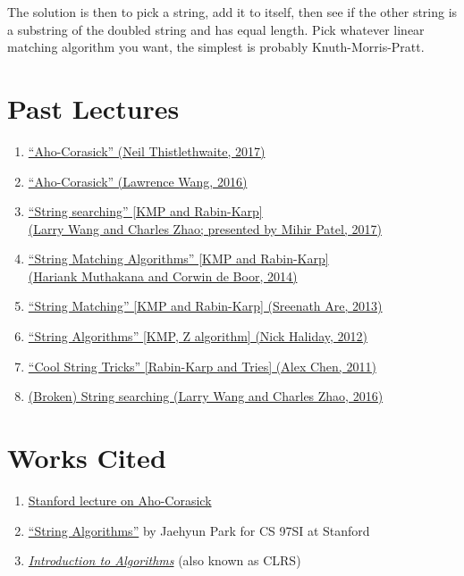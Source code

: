 \documentclass[11pt, oneside]{article}
\begin{document}
\begin{enumerate}
  The solution is then to pick a string, add it to itself, then see if the other string is a substring of the doubled string
  and has equal length. Pick whatever linear matching algorithm you want, the simplest is probably Knuth-Morris-Pratt.

\end{enumerate}

\newpage

\section{Past Lectures}

\begin{enumerate}
  \item \href{https://activities.tjhsst.edu/sct/lectures/1617/2017-06-02_Aho_Corasick.pdf}{``Aho-Corasick'' (Neil Thistlethwaite, 2017)}
  \item \href{https://activities.tjhsst.edu/sct/lectures/1516/SCT_Aho_Corasick.pdf}{``Aho-Corasick'' (Lawrence Wang, 2016)}
  \item \href{https://activities.tjhsst.edu/sct/lectures/1718/2017-10-27_String_Searching.pdf}{``String searching'' [KMP and Rabin-Karp] \\ (Larry Wang and Charles Zhao; presented by Mihir Patel, 2017)}
  \item \href{https://activities.tjhsst.edu/sct/lectures/1415/stringmatching_10_3_14.pdf}{``String Matching Algorithms'' [KMP and Rabin-Karp] \\ (Hariank Muthakana and Corwin de Boor, 2014)}
  \item \href{https://activities.tjhsst.edu/sct/lectures/1314/string_matching_11_01_13.pdf}{``String Matching'' [KMP and Rabin-Karp] (Sreenath Are, 2013)}
  \item \href{https://activities.tjhsst.edu/sct/lectures/1112/string.pdf}{``String Algorithms'' [KMP, Z algorithm] (Nick Haliday, 2012)}
  \item \href{https://activities.tjhsst.edu/sct/lectures/1112/strings111811.pdf}{``Cool String Tricks'' [Rabin-Karp and Tries] (Alex Chen, 2011)}
  \item \href{https://activities.tjhsst.edu/sct/lectures/1617/2016-11-11_String_Searching.pdf}{(Broken) String searching (Larry Wang and Charles Zhao, 2016)}
\end{enumerate}

\section{Works Cited}

\begin{enumerate}
  \item \href{http://web.stanford.edu/class/archive/cs/cs166/cs166.1166/lectures/02/Small02.pdf}{Stanford lecture on Aho-Corasick}
  \item \href{https://web.stanford.edu/class/cs97si/10-string-algorithms.pdf}{``String Algorithms''} by Jaehyun Park for CS 97SI at Stanford
  \item \href{https://mitpress.mit.edu/books/introduction-algorithms-third-edition}{\textit{Introduction to Algorithms}} (also known as CLRS)
\end{enumerate}
\end{document}
